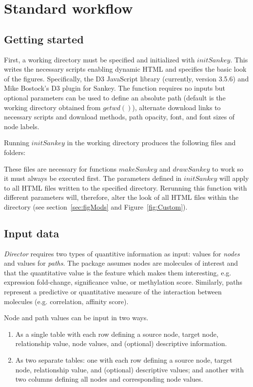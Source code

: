 \documentclass[a4paper]{article}
\begin{document}
\section{Standard workflow}
    \subsection{Getting started}
First, a working directory must be specified and initialized with $initSankey$. This writes the necessary scripts enabling dynamic HTML and specifies the basic look of the figures. Specifically, the D3 JavaScript library (currently, version 3.5.6) and Mike Bostock's D3 plugin for Sankey. The function requires no inputs but optional parameters can be used to define an absolute path (default is the working directory obtained from $getwd()$), alternate download links to necessary scripts and download methods, path opacity, font, and font sizes of node labels.

Running $initSankey$ in the working directory produces the following files and folders:

These files are necessary for functions $makeSankey$ and $drawSankey$ to work so it must always be executed first. The parameters defined in $initSankey$ will apply to all HTML files written to the specified directory. Rerunning this function with different parameters will, therefore, alter the look of all HTML files within the directory (see section~\ref{sec:figMods} and Figure~\ref{fig:Custom}).

    \subsection{Input data}
\textit{Director} requires two types of quantitive information as input: values for \textit{nodes} and values for \textit{paths}. The package assumes nodes are molecules of interest and that the quantitative value is the feature which makes them interesting, e.g. expression fold-change, significance value, or methylation score. Similarly, paths represent a predictive or quantitative measure of the interaction between molecules (e.g. correlation, affinity score).

Node and path values can be input in two ways.
    \begin{enumerate}
        \item As a single table with each row defining a source node, target node, relationship value, node values, and (optional) descriptive information.
        \item As two separate tables: one with each row defining a source node, target node, relationship value, and (optional) descriptive values; and another with two columns defining all nodes and corresponding node values.
    \end{enumerate}
\end{document}
